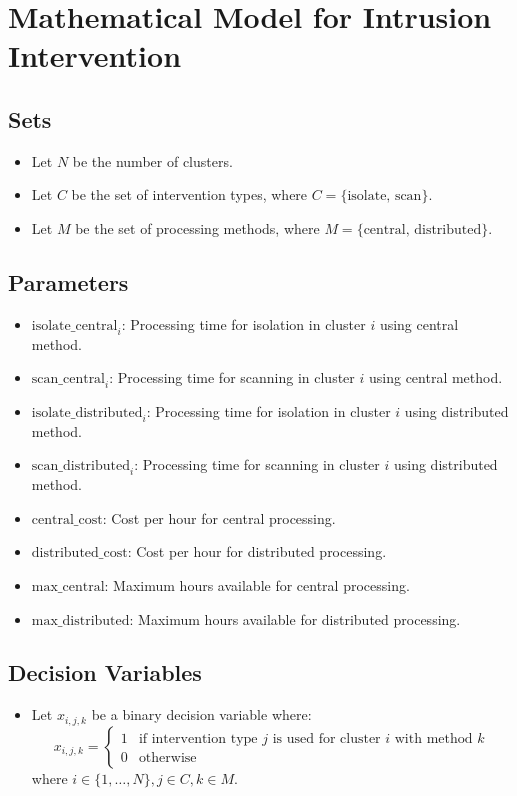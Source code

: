 \documentclass{article}
\begin{document}
\section*{Mathematical Model for Intrusion Intervention}

\subsection*{Sets}
\begin{itemize}
    \item Let \( N \) be the number of clusters.
    \item Let \( C \) be the set of intervention types, where \( C = \{ \text{isolate, scan} \} \).
    \item Let \( M \) be the set of processing methods, where \( M = \{ \text{central, distributed} \} \).
\end{itemize}

\subsection*{Parameters}
\begin{itemize}
    \item \( \text{isolate\_central}_i \): Processing time for isolation in cluster \( i \) using central method.
    \item \( \text{scan\_central}_i \): Processing time for scanning in cluster \( i \) using central method.
    \item \( \text{isolate\_distributed}_i \): Processing time for isolation in cluster \( i \) using distributed method.
    \item \( \text{scan\_distributed}_i \): Processing time for scanning in cluster \( i \) using distributed method.
    \item \( \text{central\_cost} \): Cost per hour for central processing.
    \item \( \text{distributed\_cost} \): Cost per hour for distributed processing.
    \item \( \text{max\_central} \): Maximum hours available for central processing.
    \item \( \text{max\_distributed} \): Maximum hours available for distributed processing.
\end{itemize}

\subsection*{Decision Variables}
\begin{itemize}
    \item Let \( x_{i,j,k} \) be a binary decision variable where:
        \[
        x_{i,j,k} =
        \begin{cases}
        1 & \text{if intervention type } j \text{ is used for cluster } i \text{ with method } k \\
        0 & \text{otherwise}
        \end{cases}
        \]
    where \( i \in \{1, \ldots, N\}, j \in C, k \in M \).
\end{itemize}
\end{document}
